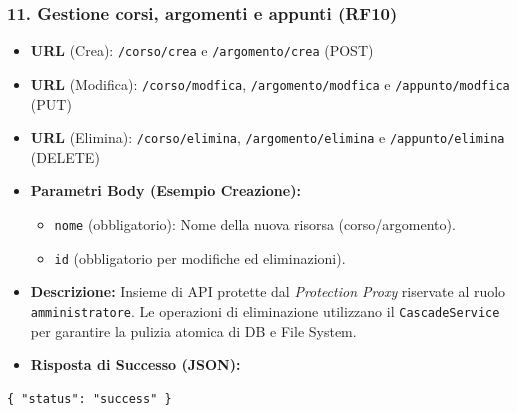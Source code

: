 \subsubsection{11. Gestione corsi, argomenti e appunti (RF10)}
\begin{itemize}
    \item \textbf{URL} (Crea): \texttt{/corso/crea} e \texttt{/argomento/crea} (POST) 
    \item \textbf{URL} (Modifica): \texttt{/corso/modfica}, \texttt{/argomento/modfica} e \texttt{/appunto/modfica} (PUT)
    \item \textbf{URL} (Elimina): \texttt{/corso/elimina}, \texttt{/argomento/elimina} e \texttt{/appunto/elimina} (DELETE)
    \item \textbf{Parametri Body (Esempio Creazione):}
        \begin{itemize}
            \item \texttt{nome} (obbligatorio): Nome della nuova risorsa (corso/argomento).
            \item \texttt{id} (obbligatorio per modifiche ed eliminazioni).
        \end{itemize}
    \item \textbf{Descrizione:} Insieme di API protette dal \textit{Protection Proxy} riservate al ruolo \texttt{amministratore}. Le operazioni di eliminazione utilizzano il \texttt{CascadeService} per garantire la pulizia atomica di DB e File System.
    \item \textbf{Risposta di Successo (JSON):}
\end{itemize}
\begin{verbatim}
{ "status": "success" }
\end{verbatim}

